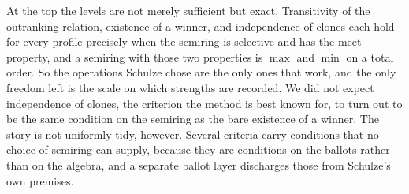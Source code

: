 \documentclass[a4paper,UKenglish,cleveref,autoref,thm-restate,anonymous]{lipics-v2021}
\begin{document}
At the top the levels are not merely sufficient but exact. Transitivity of
the outranking relation, existence of a winner, and independence of clones
each hold for every profile precisely when the semiring is selective and
has the meet property, and a semiring with those two properties is $\max$
and $\min$ on a total order. So the operations Schulze chose are the only
ones that work, and the only freedom left is the scale on which strengths
are recorded. We did not expect independence of clones, the criterion the
method is best known for, to turn out to be the same condition on the
semiring as the bare existence of a winner. The story is not uniformly
tidy, however. Several criteria carry conditions that no choice of
semiring can supply, because they are conditions on the ballots rather
than on the algebra, and a separate ballot layer discharges those from
Schulze's own premises.


\end{document}
